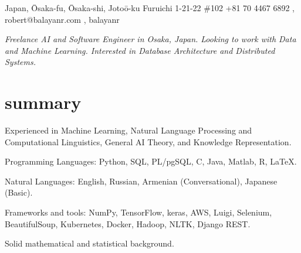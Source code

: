\documentclass[]{cv-roald}
\begin{document}
\pagestyle{empty} %

{\faMapMarker \hspace{\FAspace} Japan, Ōsaka-fu, Ōsaka-shi, Jotoō-ku Furuichi 1-21-22 \#102}
{\faMobile \hspace{\FAspace} +81 70 4467 6892 \sep
\href{mailto:robert@balayanr.com}{\faEnvelope} \hspace{\FAspace} \faSkype\hspace{\FAspace} robert@balayanr.com \sep
\href{https://www.linkedin.com/in/balayanr/}{\faLinkedinSquare} \hspace{\FAspace} \href{https://github.com/balayanr}{\faGithub} \hspace{\FAspace} \href{https://www.facebook.com/balayanr}{\faFacebookSquare} \hspace{\FAspace}\href{https://vk.com/yahhh_gf}{\faVk} \hspace{\FAspace} balayanr \FAspace  %
}
\hypersetup{
    urlcolor=darkermain
}


\textit{Freelance AI and Software Engineer  in Osaka, Japan. Looking to work with Data and Machine Learning. Interested in Database Architecture and Distributed Systems.}

\section*{summary}
\begin{tabitemize}
    \item Experienced in Machine Learning, Natural Language Processing and Computational Linguistics, General AI Theory, and Knowledge Representation.
    \item Programming Languages: Python, SQL, PL/pgSQL, C, Java, Matlab, R, \LaTeX.
    \item Natural Languages: English, Russian, Armenian (Conversational), Japanese (Basic).
    \item Frameworks and tools: NumPy, TensorFlow, keras, AWS, Luigi, Selenium, BeautifulSoup, Kubernetes, Docker, Hadoop, NLTK, Django REST.
    \item Solid mathematical and statistical background.
\end{tabitemize}
\end{document}
